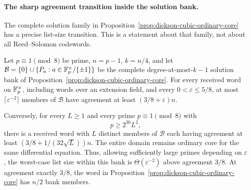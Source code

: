 \paragraph{The sharp agreement transition inside the solution bank.}
The complete solution family in
Proposition~\ref{prop:dickson-cubic-ordinary-core} has a precise
list-size transition.  This is a statement about that family, not about
all Reed--Solomon codewords.

\begin{theorem}\label{thm:dickson-sharp-transition}
Let $p\equiv1\pmod8$ be prime, $n=p-1$, $k=n/4$, and let
$\mathcal B=\{0\}\cup\{P_a:a\in\mathbb F_p^\times/\{\pm1\}\}$ be the
complete degree-at-most-$k-1$ solution bank of
Proposition~\ref{prop:dickson-cubic-ordinary-core}.
For every received word on $\mathbb F_p^\times$, including words over an
extension field, and every $0<\varepsilon\le5/8$, at most
$\lceil\varepsilon^{-2}\rceil$ members of $\mathcal B$ have agreement
at least $(3/8+\varepsilon)n$.

Conversely, for every $L\ge1$ and every prime $p\equiv1\pmod8$ with
\[
 p\ge2^{36}L^2,
\]
there is a received word with $L$ distinct members of $\mathcal B$
each having agreement at least
$(3/8+1/(32\sqrt L))n$.  The entire domain remains ordinary core
for the same differential equation.
Thus, allowing sufficiently large primes depending on $\varepsilon$,
the worst-case list size within this bank is
$\Theta(\varepsilon^{-2})$ above agreement $3/8$.
At agreement exactly $3/8$, the word in
Proposition~\ref{prop:dickson-cubic-ordinary-core} has $n/2$ bank members.
\end{theorem}
